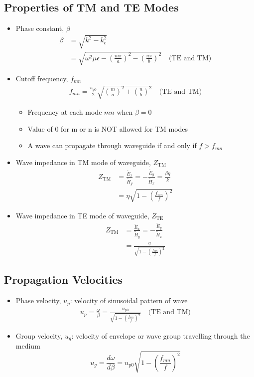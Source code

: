 \documentclass[a4paper]{article}
\begin{document}
\subsection{Properties of TM and TE Modes}
\begin{itemize}
    \item Phase constant, $\beta$
    \begin{align*}
        \beta &= \sqrt{k^2-k_c^2}\\
        &= \sqrt{\omega^2\mu\epsilon-\left(\frac{m\pi}{a}\right)^2-\left(\frac{n\pi}{b}\right)^2}\quad\text{(TE and TM)}
    \end{align*}
    \item Cutoff frequency, $f_{mn}$
    \begin{align*}
        f_{mn} = \frac{u_\text{p0}}{2}\sqrt{\left(\frac{m}{a}\right)^2+\left(\frac{n}{b}\right)^2}\quad\text{(TE and TM)}
    \end{align*}
    \begin{itemize}[label=$\circ$]
        \item Frequency at each mode $mn$ when $\beta = 0$
        \item Value of 0 for m or n is NOT allowed for TM modes
        \item A wave can propagate through waveguide if and only if $f > f_{mn}$
    \end{itemize}
    \item Wave impedance in TM mode of waveguide, $Z_\text{TM}$
    \begin{align*}
        Z_\text{TM} &= \frac{\widetilde{E}_x}{\widetilde{H}_y} = -\frac{\widetilde{E}_y}{\widetilde{H}_x} = \frac{\beta\eta}{k}\\
        &= \eta\sqrt{1-\left(\frac{f_{mn}}{f}\right)^2}
    \end{align*}
    \item Wave impedance in TE mode of waveguide, $Z_\text{TE}$
    \begin{align*}
        Z_\text{TM} &= \frac{\widetilde{E}_x}{\widetilde{H}_y} = -\frac{\widetilde{E}_y}{\widetilde{H}_x}\\
        &= \frac{\eta}{\sqrt{1-\left(\displaystyle\frac{f_{mn}}{f}\right)^2}}
    \end{align*}
\end{itemize}

\subsection{Propagation Velocities}
\begin{itemize}
    \item Phase velocity, $u_p$: velocity of sinusoidal pattern of wave
    \begin{align*}
        u_p = \frac{\omega}{\beta} = \frac{u_\text{p0}}{\sqrt{1-\left(\displaystyle\frac{f_{mn}}{f}\right)^2}}\quad\text{(TE and TM)}
    \end{align*}
    \item Group velocity, $u_g$: velocity of envelope or wave group travelling through the medium
    $$u_g = \frac{d\omega}{d\beta   } = u_\text{p0}\sqrt{1-\left(\frac{f_{mn}}{f}\right)^2}$$
\end{itemize}
\end{document}
